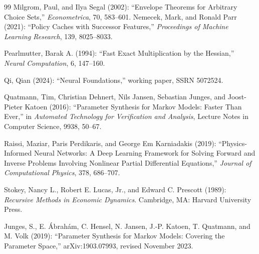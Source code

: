 \begin{thebibliography}{99}
Milgrom, Paul, and Ilya Segal (2002): ``Envelope Theorems for Arbitrary Choice Sets,'' \emph{Econometrica}, 70, 583--601.
Nemecek, Mark, and Ronald Parr (2021): ``Policy Caches with Successor Features,'' \emph{Proceedings of Machine Learning Research}, 139, 8025--8033.

Pearlmutter, Barak A. (1994): ``Fast Exact Multiplication by the Hessian,'' \emph{Neural Computation}, 6, 147--160.

Qi, Qian (2024): ``Neural Foundations,'' working paper, SSRN 5072524.

Quatmann, Tim, Christian Dehnert, Nils Jansen, Sebastian Junges, and Joost-Pieter Katoen (2016): ``Parameter Synthesis for Markov Models: Faster Than Ever,'' in \emph{Automated Technology for Verification and Analysis}, Lecture Notes in Computer Science, 9938, 50--67.

Raissi, Maziar, Paris Perdikaris, and George Em Karniadakis (2019): ``Physics-Informed Neural Networks: A Deep Learning Framework for Solving Forward and Inverse Problems Involving Nonlinear Partial Differential Equations,'' \emph{Journal of Computational Physics}, 378, 686--707.

Stokey, Nancy L., Robert E. Lucas, Jr., and Edward C. Prescott (1989): \emph{Recursive Methods in Economic Dynamics}. Cambridge, MA: Harvard University Press.

\par
{}
Junges, S., E. \'{A}brah\'{a}m, C. Hensel, N. Jansen, J.-P. Katoen, T. Quatmann, and M. Volk (2019): ``Parameter Synthesis for Markov Models: Covering the Parameter Space,'' arXiv:1903.07993, revised November 2023.

\end{thebibliography}
